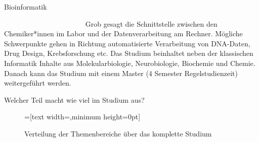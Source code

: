 
\begin{Huge}
    Bioinformatik
\end{Huge}

\begin{exampleblock}{\textcolor{white}{Was ist der Studiengang?}}
    Grob gesagt die Schnittstelle zwischen den Chemiker*innen im Labor und der Datenverarbeitung am Rechner. Mögliche Schwerpunkte gehen in Richtung automatisierte Verarbeitung von DNA-Daten, Drug Design, Krebsforschung etc.
    Das Studium beinhaltet neben der klassischen Informatik Inhalte aus Molekularbiologie, Neurobiologie, Biochemie und Chemie. Danach kann das Studium mit einem Master (4 Semester Regelstudienzeit) weitergeführt werden.
\end{exampleblock}

\begin{block}{Welcher Teil macht wie viel im Studium aus?}
    \begin{figure}[h!]
        \begin{minipage}{\linewidth}
            \centering
            =[text width={},minimum height=0pt]
        \end{minipage}
        \vspace{-20pt}
	\caption{Verteilung der Themenbereiche über das komplette Studium}
    \end{figure}
\end{block}

